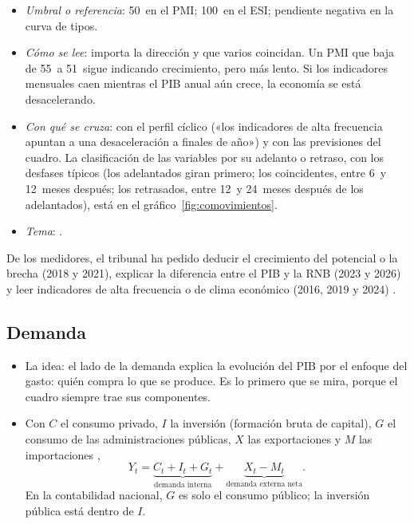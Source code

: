 \documentclass[11pt]{article}
\begin{document}
\begin{itemize}
\begin{itemize}
  \item Otros adelantados: bolsa, crédito nuevo, pedidos industriales, permisos de construcción.
  \item \emph{Coincidentes}: producción industrial, afiliación, ventas minoristas, consumo de electricidad.
  \item \emph{Retrasados}: tasa de paro, inflación subyacente, tipos de interés de los préstamos \parencite{ConferenceBoard2026LEI}.
  \end{itemize}
\item \emph{Umbral o referencia}: 50~en el PMI; 100~en el ESI; pendiente negativa en la curva de tipos.
\item \emph{Cómo se lee}: importa la dirección y que varios coincidan. Un PMI que baja de 55~a 51~sigue indicando crecimiento, pero más lento. Si los indicadores mensuales caen mientras el PIB anual aún crece, la economía se está desacelerando.
\item \emph{Con qué se cruza}: con el perfil cíclico («los indicadores de alta frecuencia apuntan a una desaceleración a finales de año») y con las previsiones del cuadro. La clasificación de las variables por su adelanto o retraso, con los desfases típicos (los adelantados giran primero; los coincidentes, entre 6~y 12~meses después; los retrasados, entre 12~y 24~meses después de los adelantados), está en el gráfico~\ref{fig:comovimientos}.
\item \emph{Tema}:  .
\end{itemize}

\begin{notaopositor}
De los medidores, el tribunal ha pedido deducir el crecimiento del potencial o la brecha (2018 y 2021), explicar la diferencia entre el PIB y la RNB (2023 y 2026) y leer indicadores de alta frecuencia o de clima económico (2016, 2019 y 2024) \parencite{ATCEE2026Examenes}.
\end{notaopositor}

\subsection{Demanda}\label{sec:demanda}

\begin{itemize}
\item La idea: el lado de la demanda explica la evolución del PIB por el enfoque del gasto: quién compra lo que se produce. Es lo primero que se mira, porque el cuadro siempre trae sus componentes.
\item Con $C$ el consumo privado, $I$ la inversión (formación bruta de capital), $G$ el consumo de las administraciones públicas, $X$ las exportaciones y $M$ las importaciones ,
\[
Y_t=\underbrace{C_t+I_t+G_t}_{\text{demanda interna}}+\underbrace{X_t-M_t}_{\text{demanda externa neta}} .
\]
En la contabilidad nacional, $G$ es solo el consumo público; la inversión pública está dentro de $I$.
\end{itemize}
\end{document}
